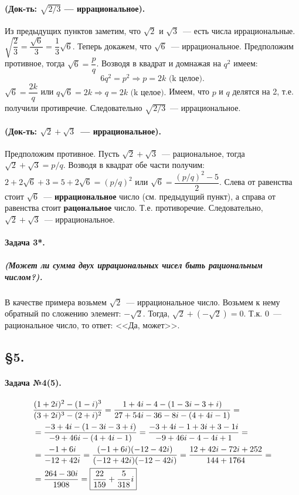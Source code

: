 \documentclass[a4paper,12pt]{report}
\begin{document}
\paragraph{(Док-ть: $ \sqrt{2/3} $ --- иррациональное).}
Из предыдущих пунктов заметим, что $ \sqrt{2} $ и
$ \sqrt{3} $~--- есть числа иррациональные.
$ \sqrt{\dfrac{2}{3}}=\dfrac{\sqrt{6}}{3}=\dfrac{1}{3}\sqrt{6} $.
Теперь докажем, что $ \sqrt{6} $~--- иррациональное. 
Предположим противное, тогда $ \sqrt{6}=\dfrac{p}{q} $.
Возводя в квадрат и домнажая на $ q^2 $ имеем: $$ 6q^2=p^2 
\Rightarrow p=2k \text{ (k целое).}$$ 
$ \sqrt{6}=\dfrac{2k}{q} $ или 
$ q\sqrt{6}=2k \Rightarrow q=2k\text{ (k целое).}$  
Имеем, что $ p $ и $ q $ делятся на 2, т.е. получили противречие.
Следовательно $ \sqrt{2/3} $~--- иррациональное.

\paragraph{(Док-ть: $ \sqrt{2} + \sqrt{3} $~--- иррациональное).}
Предположим противное.
Пусть $ \sqrt{2} + \sqrt{3} $~--- рациональное, тогда
$ \sqrt{2} + \sqrt{3} = p/q $. Возводя в квадрат обе части получим: 
$ 2 + 2\sqrt{6} + 3 = 
5 + 2\sqrt{6} = (p/q)^2 $ или 
$ \sqrt{6}= \dfrac{(p/q)^2 - 5}{2} $.  
Слева от равенства стоит $ \sqrt{6} $~--- \textbf{иррациональное} 
число (см. предыдущий пункт), а справа от равенства 
стоит \textbf{рацональное} число. Т.е. противоречие.
Следовательно, $ \sqrt{2} + \sqrt{3} $~--- иррациональное.

\paragraph{Задача 3*.}
\subparagraph{(Может ли сумма двух иррациональных чисел быть рациональным числом?).} 
В качестве примера возьмем $ \sqrt{2} $~--- иррациональное число.
Возьмем к нему обратный по сложению элемент: $ -\sqrt{2} $. Тогда,
$ \sqrt{2} + (-\sqrt{2}) = 0 $. Т.к. 0~--- рациональное число, то 
ответ: <<Да, может>>.

\subsection*{\S5.\\}

\paragraph{Задача №4(5).}

\begin{align*}
	&\dfrac{(1+2i)^2-(1-i)^3}{(3+2i)^3-(2+i)^2}=
	\dfrac{1+4i-4-(1-3i-3+i)}{27+54i-36-8i-(4+4i-1)}=\\
	&=\dfrac{-3+4i-(1-3i-3+i)}{-9+46i-(4+4i-1)}=
	\dfrac{-3+4i-1+3i+3-1i}{-9+46i-4-4i+1}=\\
	&=\dfrac{-1+6i}{-12+42i}=
	\dfrac{(-1+6i)(-12-42i)}{(-12+42i)(-12-42i)}=
	\dfrac{12+42i-72i+252}{144+1764}=\\
	&=\dfrac{264-30i}{1908}=
	\fbox{$ \dfrac{22}{159}+\dfrac{5}{318}i $} 
\end{align*}
\end{document}
